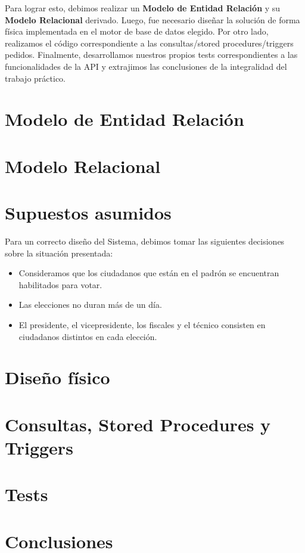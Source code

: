 \documentclass[10pt,a4paper]{article}
\begin{document}
Para lograr esto, debimos realizar un \textbf{Modelo de Entidad Relación} y su \textbf{Modelo Relacional} derivado. Luego, fue necesario diseñar la solución de forma física implementada en el motor de base de datos elegido. Por otro lado, realizamos el código correspondiente a las consultas/stored procedures/triggers pedidos. Finalmente, desarrollamos nuestros propios tests correspondientes a las funcionalidades de la API y extrajimos las conclusiones de la integralidad del trabajo práctico.
\newpage
\section{Modelo de Entidad Relación}

%
\newpage
\section{Modelo Relacional}

\newpage
\section{Supuestos asumidos}
Para un correcto diseño del Sistema, debimos tomar las siguientes decisiones sobre la situación presentada:

\begin{itemize}
\item Consideramos que los ciudadanos que están en el padrón se encuentran habilitados para votar.
\item Las elecciones no duran más de un día.
\item El presidente, el vicepresidente, los fiscales y el técnico consisten en ciudadanos distintos en cada elección.
\end{itemize}
\newpage


\section{Diseño físico}

\newpage
\section{Consultas, Stored Procedures y Triggers}

\newpage
\section{Tests}

\newpage
\section{Conclusiones}
\end{document}
